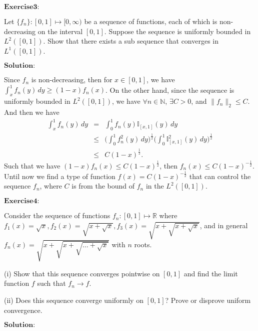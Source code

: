 \documentclass[12pt,a4paper]{ctexart}
\begin{document}
\vspace{8pt}

$\textbf{Exercise3:}$

Let $\{f_{n}\} : [0, 1] \mapsto [0, \infty) $ be a sequence of functions, each of which is non-decreasing on the interval $[0, 1]$. Suppose the sequence is uniformly bounded in $L^{2}([0, 1])$. Show that there exists a sub sequence that converges in $L^{1}([0, 1])$.

\vspace{8pt}
$\textbf{Solution:}$

Since $f_{n}$ is non-decreasing, then for $x \in [0, 1]$, we have $\int_{x}^{1} f_{n}(y) \, d y \geq (1-x) f_{n}(x)$. On the other hand, since the sequence is uniformly bounded in $L^{2}([0, 1])$, we have $\forall n \in \mathbb{N}$, $\exists C > 0$, and $\| f_{n} \|_{2} \leq C$. And then we have
\begin{eqnarray*}
\int_{x}^{1} f_{n}(y) \, d y &=& \int_{0}^{1} f_{n}(y) \mathbb{I}_{[x, 1]} (y) \, d y  \\
            &\leq & \Big( \int_{0}^{1} f^{2}_{n}(y) \, d y \Big)^{\frac{1}{2}} \Big( \int_{0}^{1} \mathbb{I}^{2}_{[x, 1]} (y) \, d y \Big)^{\frac{1}{2}} \\
            &\leq & C (1-x)^{\frac{1}{2}}.
\end{eqnarray*}
Such that we have $(1-x) f_{n}(x) \leq C (1-x)^{\frac{1}{2}}$, then $f_{n}(x) \leq C (1-x)^{- \frac{1}{2}}$. Until now we find a type of function $f(x) = C (1-x)^{- \frac{1}{2}}$ that can control the sequence $f_{n}$, where $C$ is from the bound of $f_{n}$ in the $L^{2}([0, 1])$.

\vspace{8pt}

$\textbf{Exercise4:}$

Consider the sequence of functions $f_{n}: [0, 1] \mapsto \mathbb{R}$ where $f_{1}(x) = \sqrt{x}, f_{2}(x) = \sqrt{x + \sqrt{x}}, f_{3}(x) = \sqrt{x + \sqrt{x + \sqrt{x}}}$, and in general $f_{n}(x) = \sqrt{x + \sqrt{x + \sqrt{\dots + \sqrt{x}}}}$ with $n$ roots.

(i) Show that this sequence converges pointwise on $[0, 1]$ and find the limit function $f$ such that $f_{n} \rightarrow f$.

(ii) Does this sequence converge uniformly on $[0, 1]$? Prove or disprove uniform convergence.

\vspace{8pt}
$\textbf{Solution:}$
\end{document}
